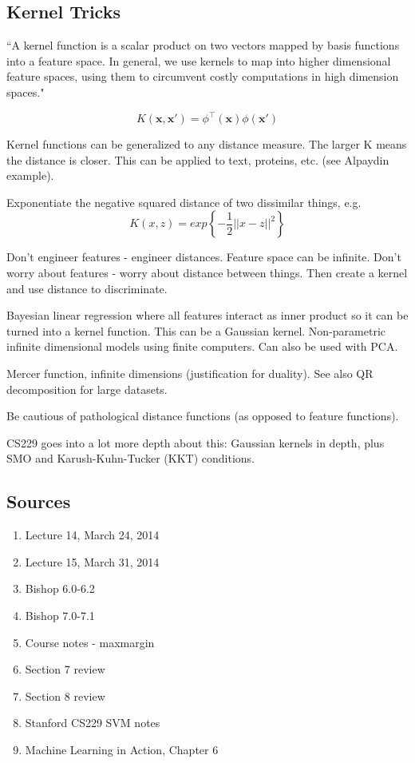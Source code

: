 \documentclass[11pt, oneside]{article}   	%
\begin{document}
\subsection {Kernel Tricks}


``A kernel function is a scalar product on two vectors mapped by basis functions into a feature space. In general, we use kernels to map into higher dimensional feature spaces, using them to circumvent costly computations in high dimension spaces."

\begin{equation}
K(\mathbf{x},\mathbf{x}') = \phi^\intercal(\mathbf{x})\phi(\mathbf{x}')
\end{equation}

Kernel functions can be generalized to any distance measure. The larger K means the distance is closer. This can be applied to text, proteins, etc. (see Alpaydin example).

Exponentiate the negative squared distance of two dissimilar things, e.g.
\begin{equation}
K(x,z) = exp\left\{ -\frac{1}{2} ||x - z||^2 \right\}
\end{equation}

Don't engineer features - engineer distances. Feature space can be infinite. Don't worry about features - worry about distance between things. Then create a kernel and use distance to discriminate.

Bayesian linear regression where all features interact as inner product so it can be turned into a kernel function. This can be a Gaussian kernel. Non-parametric infinite dimensional models using finite computers. Can also be used with PCA.

Mercer function, infinite dimensions (justification for duality). See also QR decomposition for large datasets.

Be cautious of pathological distance functions (as opposed to feature functions).

CS229 goes into a lot more depth about this: Gaussian kernels in depth, plus SMO and Karush-Kuhn-Tucker (KKT) conditions.


\subsection{Sources}

\begin{enumerate}
	\item Lecture 14, March 24, 2014
	\item Lecture 15, March 31, 2014
	\item Bishop 6.0-6.2 
	\item Bishop 7.0-7.1
	\item Course notes - maxmargin
	\item Section 7 review
	\item Section 8 review
	\item Stanford CS229 SVM notes
	\item Machine Learning in Action, Chapter 6
\end{enumerate}
\end{document}
